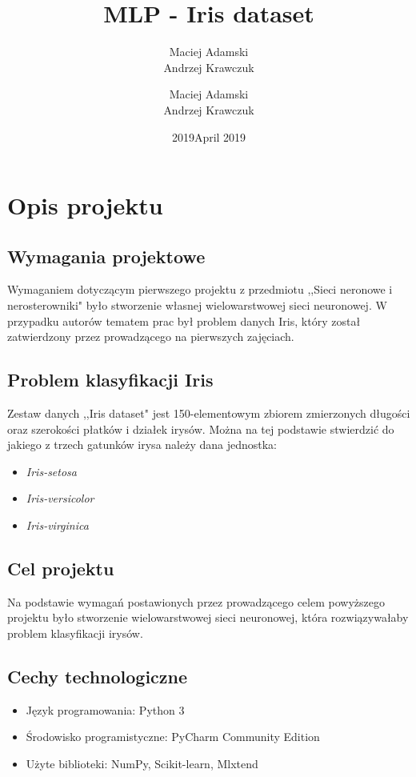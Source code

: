 \documentclass[]{mgr}
\author{Maciej Adamski \\ Andrzej Krawczuk}
\title{MLP - Iris dataset}
\date{2019}
\author{Maciej Adamski \\ Andrzej Krawczuk }
\date{April 2019}
\begin{document}
\maketitle

\chapter{Opis projektu}
\section{Wymagania projektowe}
Wymaganiem dotyczącym pierwszego projektu z przedmiotu ,,Sieci neronowe i nerosterowniki" było stworzenie własnej wielowarstwowej sieci neuronowej. W przypadku autorów tematem prac był problem danych Iris, który został zatwierdzony przez prowadzącego na pierwszych zajęciach. 

\section{Problem klasyfikacji Iris}
Zestaw danych ,,Iris dataset" jest 150-elementowym zbiorem zmierzonych długości oraz szerokości płatków i działek irysów. Można na tej podstawie stwierdzić do jakiego z trzech gatunków irysa należy dana jednostka: 
\begin{itemize}
    \item \textit{Iris-setosa}
    \item \textit{Iris-versicolor}
    \item \textit{Iris-virginica}
\end{itemize}

\section{Cel projektu}
Na podstawie wymagań postawionych przez prowadzącego celem powyższego projektu było stworzenie wielowarstwowej sieci neuronowej, która rozwiązywałaby problem klasyfikacji irysów. 

\section{Cechy technologiczne}
\begin{itemize}
    \item Język programowania: Python 3
    \item Środowisko programistyczne: PyCharm Community Edition
    \item Użyte biblioteki: NumPy, Scikit-learn, Mlxtend
\end{itemize}
\end{document}
